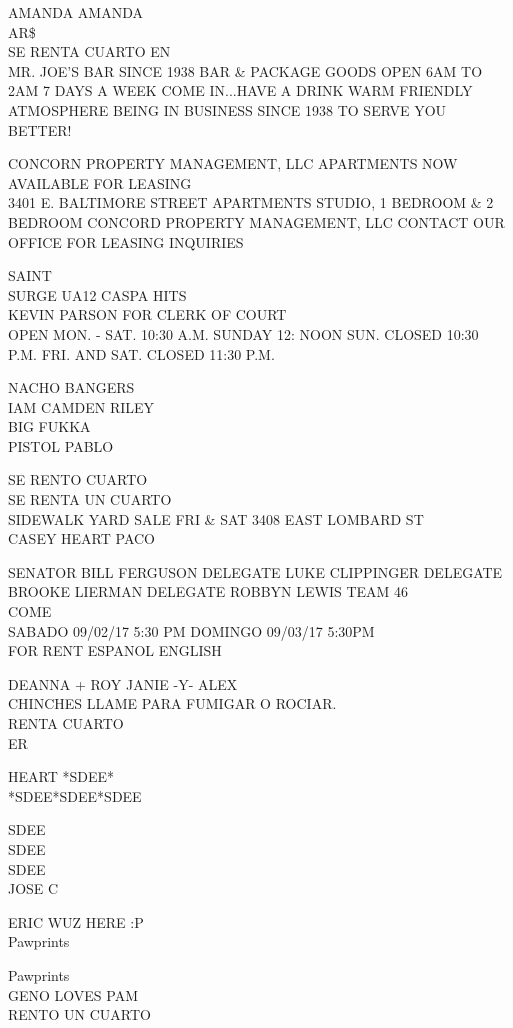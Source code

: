 \documentclass[10pt,letterpaper]{article}
\begin{document}
AMANDA AMANDA\\
AR\$\\
SE RENTA CUARTO EN\\
MR. JOE'S BAR SINCE 1938 BAR \& PACKAGE GOODS OPEN 6AM TO 2AM 7 DAYS A WEEK COME IN...HAVE A DRINK WARM FRIENDLY ATMOSPHERE BEING IN BUSINESS SINCE 1938 TO SERVE YOU BETTER!

CONCORN PROPERTY MANAGEMENT, LLC APARTMENTS NOW AVAILABLE FOR LEASING\\
3401 E. BALTIMORE STREET APARTMENTS STUDIO, 1 BEDROOM \& 2 BEDROOM CONCORD PROPERTY MANAGEMENT, LLC CONTACT OUR OFFICE FOR LEASING INQUIRIES

SAINT\\
SURGE UA12 CASPA HITS\\
KEVIN PARSON FOR CLERK OF COURT\\
OPEN MON. {-} SAT. 10:30 A.M. SUNDAY 12: NOON SUN. CLOSED 10:30 P.M. FRI. AND SAT. CLOSED 11:30 P.M.

NACHO BANGERS\\
IAM CAMDEN RILEY\\
BIG FUKKA\\
PISTOL PABLO

SE RENTO CUARTO\\
SE RENTA UN CUARTO\\
SIDEWALK YARD SALE FRI \& SAT 3408 EAST LOMBARD ST\\
CASEY HEART PACO

SENATOR BILL FERGUSON DELEGATE LUKE CLIPPINGER DELEGATE BROOKE LIERMAN DELEGATE ROBBYN LEWIS TEAM 46\\
COME\\
SABADO 09/02/17 5:30 PM DOMINGO 09/03/17 5:30PM\\
FOR RENT ESPANOL ENGLISH

DEANNA + ROY JANIE {-}Y{-} ALEX\\
CHINCHES LLAME PARA FUMIGAR O ROCIAR.\\
RENTA CUARTO\\
ER

HEART *SDEE*\\
*SDEE*SDEE*SDEE

SDEE\\
SDEE\\
SDEE\\
JOSE C

ERIC WUZ HERE :P\\
Pawprints

Pawprints\\
GENO LOVES PAM\\
RENTO UN CUARTO
\end{document}
